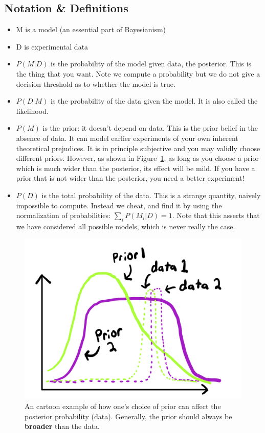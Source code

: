 \documentclass[12pt]{article}
\begin{document}
\subsection{Notation \& Definitions}
\begin{itemize}
  \item M is a model (an essential part of Bayesianism)
  \item D is experimental data
    \item $P(M|D)$ is the probability of the model given data, the posterior. This is the thing that you want. Note we compute a probability but we do not give a decision threshold as to whether the model is true.
    \item $P(D|M)$ is the probability of the data given the model. It is also called the likelihood.
    \item $P(M)$ is the prior: it doesn't depend on data. This is the prior belief in the absence of data. It can model earlier experiments of your own inherent theoretical prejudices. It is in principle subjective and you may validly choose different priors. However, as shown in Figure~\ref{fig:prior_plot}, as long as you choose a prior which is much wider than the posterior, its effect will be mild. If you have a prior that is not wider than the posterior, you need a better experiment!
    \item $P(D)$ is the total probability of the data. This is a strange quantity, naively impossible to compute. Instead we cheat, and find it by using the normalization of probabilities: $\sum_i P(M_i|D)=1$. Note that this asserts that we have considered all possible models, which is never really the case.
\end{itemize}

\begin{figure}[ht]
\includegraphics[scale=0.75]{prior_plot.png}
\centering
\caption{An cartoon example of how one's choice of prior can affect the posterior probability (data). Generally, the prior should always be \textbf{broader} than the data.} \label{fig:prior_plot}
\end{figure}
\end{document}
